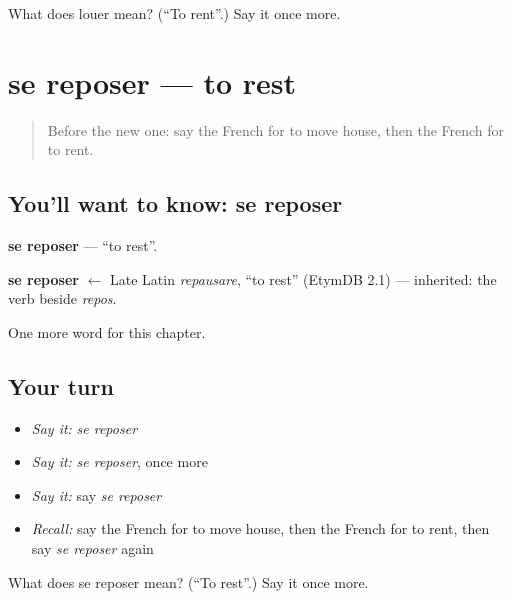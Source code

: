 \begin{tcolorbox}[breakable,colback=teal!4,colframe=teal!35!black,title={Before you move on}]
What does louer mean? (\textquotedblleft{}To rent\textquotedblright{}.) Say it once more.
\end{tcolorbox}
\section[se reposer]{se reposer — to rest}

\label{lesson:FR-C235-reposer}



\begin{quote}
Before the new one: say the French for to move house, then the French for to rent.
\end{quote}

\subsection*{You'll want to know: se reposer}
\textbf{se reposer} — \textquotedblleft{}to rest\textquotedblright{}.

\begin{cousinweb}
\textbf{se reposer} $\leftarrow$ Late Latin \emph{repausare}, \textquotedblleft{}to rest\textquotedblright{} (EtymDB 2.1) — inherited: the verb beside \emph{repos}.
\end{cousinweb}

\begin{grammarlens}[title={What you've built}]
One more word for this chapter.
\end{grammarlens}

\subsection*{Your turn}
\begin{itemize}
\raggedright
  \item \emph{Say it:} \emph{se reposer}
  \item \emph{Say it:} \emph{se reposer}, once more
  \item \emph{Say it:} say \emph{se reposer}
  \item \emph{Recall:} say the French for to move house, then the French for to rent, then say \emph{se reposer} again
\end{itemize}

\begin{tcolorbox}[breakable,colback=teal!4,colframe=teal!35!black,title={Before you move on}]
What does se reposer mean? (\textquotedblleft{}To rest\textquotedblright{}.) Say it once more.
\end{tcolorbox}
